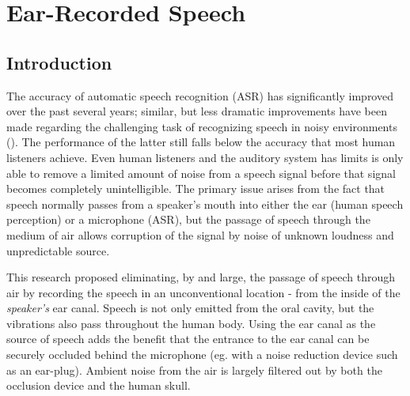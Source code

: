 % 
% 
% 



\chapter{Ear-Recorded Speech\label{chapter2}}


\section{Introduction}

The accuracy of automatic speech recognition (ASR) has significantly improved over the past several years; similar, but less dramatic improvements have been made regarding the challenging task of recognizing speech in noisy environments (\cite{zhang:17}).  The performance of the latter still falls below the accuracy that most human listeners achieve.  Even human listeners and the auditory system has limits is only able to remove a limited amount of noise from a speech signal before that signal becomes completely unintelligible.  The primary issue arises from the fact that speech normally passes from a speaker's mouth into either the ear (human speech perception) or a microphone (ASR), but the passage of speech through the medium of air allows corruption of the signal by noise of unknown loudness and unpredictable source.  

This research proposed eliminating, by and large, the passage of speech through air by recording the speech in an unconventional location - from the inside of the \textit{speaker's} ear canal.  Speech is not only emitted from the oral cavity, but the vibrations also pass throughout the human body.  Using the ear canal as the source of speech adds the benefit that the entrance to the ear canal can be securely occluded behind the microphone (eg. with a noise reduction device such as an ear-plug).  Ambient noise from the air is largely filtered out by both the occlusion device and the human skull.

